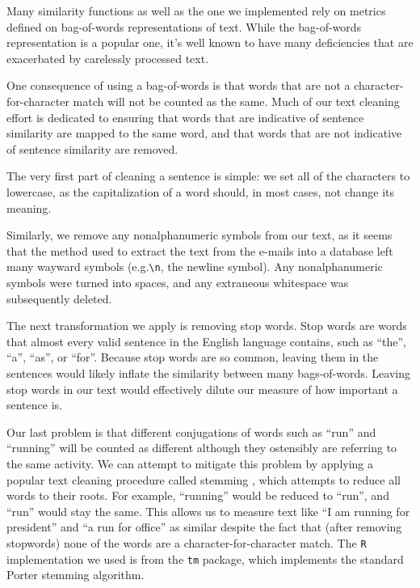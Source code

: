 Many similarity functions \cite{textrank-sim-var} as well as the one we implemented rely on metrics defined on bag-of-words representations of text.
While the bag-of-words representation is a popular one, it's well known to have many deficiencies that are exacerbated by carelessly processed text.

One consequence of using a bag-of-words is that words that are not a character-for-character match will not be counted as the same.
Much of our text cleaning effort is dedicated to ensuring that words that are indicative of sentence similarity are mapped to the same word, and that words that are not indicative of sentence similarity are removed.

The very first part of cleaning a sentence is simple: we set all of the characters to lowercase, as the capitalization of a word should, in most cases, not change its meaning.

Similarly, we remove any nonalphanumeric symbols from our text, as it seems that the method used to extract the text from the e-mails into a database left many wayward symbols (e.g.\verb!\n!, the newline symbol).
Any nonalphanumeric symbols were turned into spaces, and any extraneous whitespace was subsequently deleted.

The next transformation we apply is removing stop words.
Stop words are words that almost every valid sentence in the English language contains, such as ``the'', ``a'', ``as'', or ``for''.
Because stop words are so common, leaving them in the sentences would likely inflate the similarity between many bags-of-words.
Leaving stop words in our text would effectively dilute our measure of how important a sentence is.

Our last problem is that different conjugations of words such as ``run'' and ``running'' will be counted as different although they ostensibly are referring to the same activity.
We can attempt to mitigate this problem by applying a popular text cleaning procedure called stemming \cite{willett2006porter}, which attempts to reduce all words to their roots.
For example, ``running'' would be reduced to ``run'', and ``run'' would stay the same.
This allows us to measure text like ``I am running for president'' and ``a run for office'' as similar despite the fact that (after removing stopwords) none of the words are a character-for-character match.
The \texttt{R} implementation we used is from the \texttt{tm} package, which implements the standard Porter stemming algorithm.
